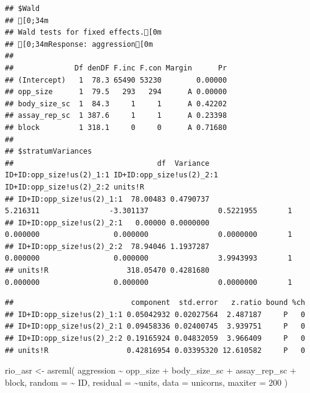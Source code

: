 \documentclass[
  12pt,
]{book}
\newenvironment{Shaded}{\begin{snugshade}}{\end{snugshade}}
\newcommand{\AttributeTok}[1]{\textcolor[rgb]{0.77,0.63,0.00}{#1}}
\newcommand{\DecValTok}[1]{\textcolor[rgb]{0.00,0.00,0.81}{#1}}
\newcommand{\FunctionTok}[1]{\textcolor[rgb]{0.00,0.00,0.00}{#1}}
\newcommand{\NormalTok}[1]{#1}
\newcommand{\OtherTok}[1]{\textcolor[rgb]{0.56,0.35,0.01}{#1}}
\newcommand{\SpecialCharTok}[1]{\textcolor[rgb]{0.00,0.00,0.00}{#1}}
\begin{document}
\begin{verbatim}
## $Wald
## [0;34m
## Wald tests for fixed effects.[0m
## [0;34mResponse: aggression[0m
## 
##              Df denDF F.inc F.con Margin      Pr
## (Intercept)   1  78.3 65490 53230        0.00000
## opp_size      1  79.5   293   294      A 0.00000
## body_size_sc  1  84.3     1     1      A 0.42202
## assay_rep_sc  1 387.6     1     1      A 0.23398
## block         1 318.1     0     0      A 0.71680
## 
## $stratumVariances
##                                 df  Variance ID+ID:opp_size!us(2)_1:1 ID+ID:opp_size!us(2)_2:1 ID+ID:opp_size!us(2)_2:2 units!R
## ID+ID:opp_size!us(2)_1:1  78.00483 0.4790737                 5.216311                -3.301137                0.5221955       1
## ID+ID:opp_size!us(2)_2:1   0.00000 0.0000000                 0.000000                 0.000000                0.0000000       1
## ID+ID:opp_size!us(2)_2:2  78.94046 1.1937287                 0.000000                 0.000000                3.9943993       1
## units!R                  318.05470 0.4281680                 0.000000                 0.000000                0.0000000       1
\end{verbatim}

\begin{Shaded}
\end{Shaded}

\begin{verbatim}
##                           component  std.error   z.ratio bound %ch
## ID+ID:opp_size!us(2)_1:1 0.05042932 0.02027564  2.487187     P   0
## ID+ID:opp_size!us(2)_2:1 0.09458336 0.02400745  3.939751     P   0
## ID+ID:opp_size!us(2)_2:2 0.19165924 0.04832059  3.966409     P   0
## units!R                  0.42816954 0.03395320 12.610582     P   0
\end{verbatim}

\begin{Shaded}
\begin{Highlighting}[]
\NormalTok{rio\_asr }\OtherTok{\textless{}{-}} \FunctionTok{asreml}\NormalTok{(}
\NormalTok{  aggression }\SpecialCharTok{\textasciitilde{}}\NormalTok{ opp\_size }\SpecialCharTok{+}\NormalTok{ body\_size\_sc }\SpecialCharTok{+}\NormalTok{ assay\_rep\_sc }\SpecialCharTok{+}\NormalTok{ block,}
  \AttributeTok{random =} \SpecialCharTok{\textasciitilde{}}\NormalTok{ ID,}
  \AttributeTok{residual =} \SpecialCharTok{\textasciitilde{}}\NormalTok{units,}
  \AttributeTok{data =}\NormalTok{ unicorns,}
  \AttributeTok{maxiter =} \DecValTok{200}
\NormalTok{)}
\end{Highlighting}
\end{Shaded}
\end{document}
